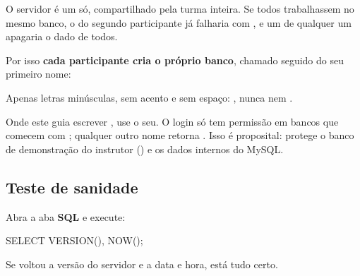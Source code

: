 O servidor é um só, compartilhado pela turma inteira. Se todos trabalhassem no
mesmo banco, o  do segundo participante já falharia com
, e um  de qualquer
um apagaria o dado de todos.

Por isso \textbf{cada participante cria o próprio banco}, chamado
 seguido do seu primeiro nome:

\begin{center}
 \quad {} \quad {}
\quad {}
\end{center}

\begin{aviso}
Apenas letras minúsculas, sem acento e sem espaço: , nunca
 nem .

Onde este guia escrever , use o seu. O login
 só tem permissão em bancos que comecem com ;
qualquer outro nome retorna . Isso é
proposital: protege o banco de demonstração do instrutor () e os
dados internos do MySQL.
\end{aviso}

\subsection{Teste de sanidade}

Abra a aba \textbf{SQL} e execute:

\begin{sqlcode}
SELECT VERSION(), NOW();
\end{sqlcode}

Se voltou a versão do servidor e a data e hora, está tudo certo.
